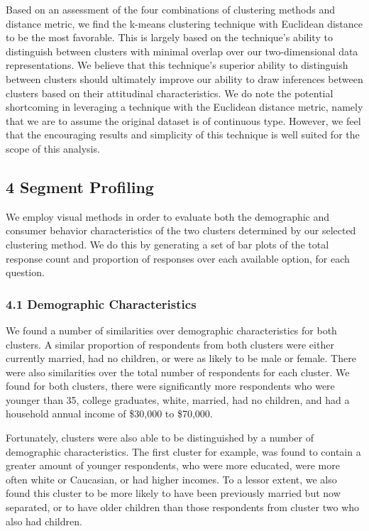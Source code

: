 \documentclass[]{article}
\begin{document}
Based on an assessment of the four combinations of clustering methods
and distance metric, we find the k-means clustering technique with
Euclidean distance to be the most favorable. This is largely based on
the technique's ability to distinguish between clusters with minimal
overlap over our two-dimensional data representations. We believe that
this technique's superior ability to distinguish between clusters should
ultimately improve our ability to draw inferences between clusters based
on their attitudinal characteristics. We do note the potential
shortcoming in leveraging a technique with the Euclidean distance
metric, namely that we are to assume the original dataset is of
continuous type. However, we feel that the encouraging results and
simplicity of this technique is well suited for the scope of this
analysis.

\subsection{4 Segment Profiling}\label{segment-profiling}

We employ visual methods in order to evaluate both the demographic and
consumer behavior characteristics of the two clusters determined by our
selected clustering method. We do this by generating a set of bar plots
of the total response count and proportion of responses over each
available option, for each question.

\subsubsection{4.1 Demographic
Characteristics}\label{demographic-characteristics}

We found a number of similarities over demographic characteristics for
both clusters. A similar proportion of respondents from both clusters
were either currently married, had no children, or were as likely to be
male or female. There were also similarities over the total number of
respondents for each cluster. We found for both clusters, there were
significantly more respondents who were younger than 35, college
graduates, white, married, had no children, and had a household annual
income of \$30,000 to \$70,000.

Fortunately, clusters were also able to be distinguished by a number of
demographic characteristics. The first cluster for example, was found to
contain a greater amount of younger respondents, who were more educated,
were more often white or Caucasian, or had higher incomes. To a lessor
extent, we also found this cluster to be more likely to have been
previously married but now separated, or to have older children than
those respondents from cluster two who also had children.
\end{document}
